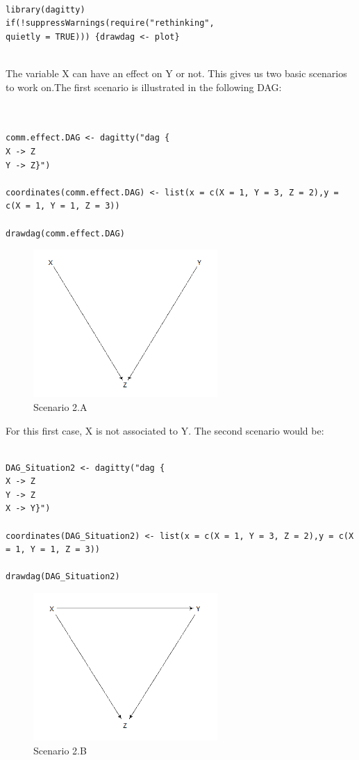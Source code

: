 \documentclass{article}
\begin{document}
\begin{lstlisting}

library(dagitty)
if(!suppressWarnings(require("rethinking", 
quietly = TRUE))) {drawdag <- plot}
  
\end{lstlisting}

The variable X can have an effect on Y or not. This gives us two basic scenarios to work on.The first scenario is illustrated in the following DAG:\par

\begin{lstlisting}


comm.effect.DAG <- dagitty("dag {
X -> Z
Y -> Z}")

coordinates(comm.effect.DAG) <- list(x = c(X = 1, Y = 3, Z = 2),y = c(X = 1, Y = 1, Z = 3))

drawdag(comm.effect.DAG)

\end{lstlisting}

\begin{figure}[h]
\caption{Scenario 2.A}
\includegraphics[width=7cm]{comm.effect.DAG.png}
\centering
\end{figure}

For this first case, X is not associated to Y. The second scenario would be:

\begin{lstlisting}

DAG_Situation2 <- dagitty("dag {
X -> Z
Y -> Z
X -> Y}")

coordinates(DAG_Situation2) <- list(x = c(X = 1, Y = 3, Z = 2),y = c(X = 1, Y = 1, Z = 3))

drawdag(DAG_Situation2)
\end{lstlisting}

\begin{figure}[h]
\caption{Scenario 2.B}
\includegraphics[width=7cm]{DAG_Situation2.png}
\centering
\end{figure}
\end{document}
